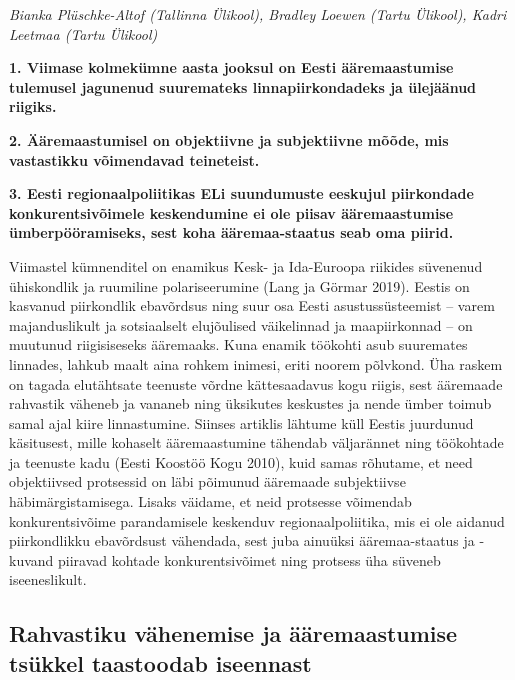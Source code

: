 \documentclass[]{book}
\begin{document}
\emph{Bianka Plüschke-Altof (Tallinna Ülikool), Bradley Loewen (Tartu Ülikool), Kadri Leetmaa (Tartu Ülikool)}

\textbf{1. Viimase kolmekümne aasta jooksul on Eesti ääremaastumise tulemusel jagunenud suuremateks linnapiirkondadeks ja ülejäänud riigiks.}

\textbf{2. Ääremaastumisel on objektiivne ja subjektiivne mõõde, mis vastastikku võimendavad teineteist.}

\textbf{3. Eesti regionaalpoliitikas ELi suundumuste eeskujul piirkondade konkurentsivõimele keskendumine ei ole piisav ääremaastumise ümberpööramiseks, sest koha ääremaa-staatus seab oma piirid.}

Viimastel kümnenditel on enamikus Kesk- ja Ida-Euroopa riikides süvenenud ühiskondlik ja ruumiline
polariseerumine (Lang ja Görmar 2019). Eestis on kasvanud piirkondlik ebavõrdsus ning suur osa Eesti
asustussüsteemist -- varem majanduslikult ja sotsiaalselt elujõulised väikelinnad ja maapiirkonnad -- on
muutunud riigisiseseks ääremaaks. Kuna enamik töökohti asub suuremates linnades, lahkub maalt aina
rohkem inimesi, eriti noorem põlvkond. Üha raskem on tagada elutähtsate teenuste võrdne kättesaadavus
kogu riigis, sest ääremaade rahvastik väheneb ja vananeb ning üksikutes keskustes ja nende ümber toimub
samal ajal kiire linnastumine. Siinses artiklis lähtume küll Eestis juurdunud käsitusest, mille kohaselt
ääremaastumine tähendab väljarännet ning töökohtade ja teenuste kadu (Eesti Koostöö Kogu 2010), kuid
samas rõhutame, et need objektiivsed protsessid on läbi põimunud ääremaade subjektiivse
häbimärgistamisega. Lisaks väidame, et neid protsesse võimendab konkurentsivõime parandamisele
keskenduv regionaalpoliitika, mis ei ole aidanud piirkondlikku ebavõrdsust vähendada, sest juba ainuüksi
ääremaa-staatus ja -kuvand piiravad kohtade konkurentsivõimet ning protsess üha süveneb iseeneslikult.

\hypertarget{rahvastiku-vahenemise-ja-aaremaastumise-tsukkel-taastoodab-iseennast}{%
\subsection{Rahvastiku vähenemise ja ääremaastumise tsükkel taastoodab iseennast}\label{rahvastiku-vahenemise-ja-aaremaastumise-tsukkel-taastoodab-iseennast}}
\end{document}
